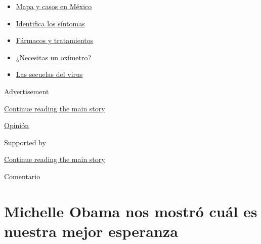 \begin{itemize}
\tightlist
\item
  \href{https://www.nytimes3xbfgragh.onion/es/interactive/2020/espanol/america-latina/coronavirus-en-mexico.html?name=styln-coronavirus-es\&region=TOP_BANNER\&variant=undefined\&block=storyline_menu_recirc\&action=click\&pgtype=Article\&impression_id=12b14900-e387-11ea-8198-d359754c6cb2}{Mapa
  y casos en México}
\item
  \href{https://www.nytimes3xbfgragh.onion/es/interactive/2020/08/06/espanol/ciencia-y-tecnologia/tengo-covid-19-sintomas.html?name=styln-coronavirus-es\&region=TOP_BANNER\&variant=undefined\&block=storyline_menu_recirc\&action=click\&pgtype=Article\&impression_id=12b14901-e387-11ea-8198-d359754c6cb2}{Identifica
  los síntomas}
\item
  \href{https://www.nytimes3xbfgragh.onion/es/interactive/2020/science/coronavirus-tratamientos-curas.html?name=styln-coronavirus-es\&region=TOP_BANNER\&variant=undefined\&block=storyline_menu_recirc\&action=click\&pgtype=Article\&impression_id=12b14902-e387-11ea-8198-d359754c6cb2}{Fármacos
  y tratamientos}
\item
  \href{https://www.nytimes3xbfgragh.onion/es/2020/04/29/espanol/estilos-de-vida/oximetro-para-que-sirve.html?name=styln-coronavirus-es\&region=TOP_BANNER\&variant=undefined\&block=storyline_menu_recirc\&action=click\&pgtype=Article\&impression_id=12b14903-e387-11ea-8198-d359754c6cb2}{¿Necesitas
  un oxímetro?}
\item
  \href{https://www.nytimes3xbfgragh.onion/es/2020/07/02/espanol/ciencia-y-tecnologia/sobrevivientes-coronavirus-recuperacion.html?name=styln-coronavirus-es\&region=TOP_BANNER\&variant=undefined\&block=storyline_menu_recirc\&action=click\&pgtype=Article\&impression_id=12b14904-e387-11ea-8198-d359754c6cb2}{Las
  secuelas del virus}
\end{itemize}

Advertisement

\protect\hyperlink{after-top}{Continue reading the main story}

\href{/es/section/opinion}{Opinión}

Supported by

\protect\hyperlink{after-sponsor}{Continue reading the main story}

Comentario

\hypertarget{michelle-obama-nos-mostruxf3-cuuxe1l-es-nuestra-mejor-esperanza}{%
\section{Michelle Obama nos mostró cuál es nuestra mejor
esperanza}\label{michelle-obama-nos-mostruxf3-cuuxe1l-es-nuestra-mejor-esperanza}}

